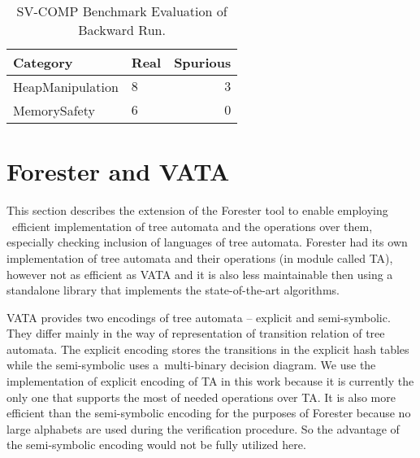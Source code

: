 \documentclass[fleqn,11pt]{ExcelAtFIT} %
\begin{document}
\begin{table}[bu]
	\vskip6pt
	\caption{SV-COMP Benchmark Evaluation of Backward Run.%
	}
	\centering
	\begin{tabular}{llr}
		\toprule
		Category & Real & Spurious \\
		\midrule
		HeapManipulation & $8$ & $3$ \\
		MemorySafety & $6$ & $0$ \\
		\bottomrule
	\end{tabular}
	\label{tab:bwres}
\end{table}


\section{Forester and VATA}
\label{sec:forvata}

This section describes the extension of the Forester tool to enable employing \vata\ 
efficient implementation of	tree automata and the operations over them,
especially checking inclusion of languages of tree automata.
Forester had its own implementation of tree automata and their operations (in module called TA),
however not as efficient as VATA and it is also less maintainable
then using a standalone library that implements the state-of-the-art algorithms.

VATA provides two encodings of tree automata -- explicit and semi-symbolic.
They differ mainly in the way of representation of transition relation of tree automata.
The explicit encoding stores the transitions in the explicit hash tables while the semi-symbolic
uses a~multi-binary decision diagram.
We use the implementation of explicit encoding of TA in this work because
it is currently the only one that supports the most of needed operations over TA.
It is also more efficient than the semi-symbolic encoding for the purposes of Forester because no large alphabets are used during the verification procedure.
So the advantage of the semi-symbolic encoding would not be fully utilized here.
\end{document}
